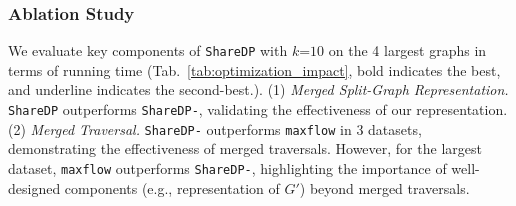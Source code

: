 
    
\subsubsection{Ablation Study}\label{sec:experiment_opt}

We evaluate key components of \texttt{ShareDP} with $k$=$10$ on the 4 largest graphs in terms of running time (Tab.~\ref{tab:optimization_impact}, bold indicates the best, and underline indicates the second-best.).
(1) {\emph{Merged Split-Graph Representation.}}  
\texttt{ShareDP} outperforms \texttt{ShareDP-}, validating the effectiveness of our representation.
(2) {\emph{Merged Traversal.}}  
\texttt{ShareDP-} outperforms \texttt{maxflow} in 3 datasets, demonstrating the effectiveness of merged traversals. However, for the largest dataset, \texttt{maxflow} outperforms \texttt{ShareDP-}, highlighting the importance of well-designed components (e.g., representation of $G'$) beyond merged traversals.


%         
